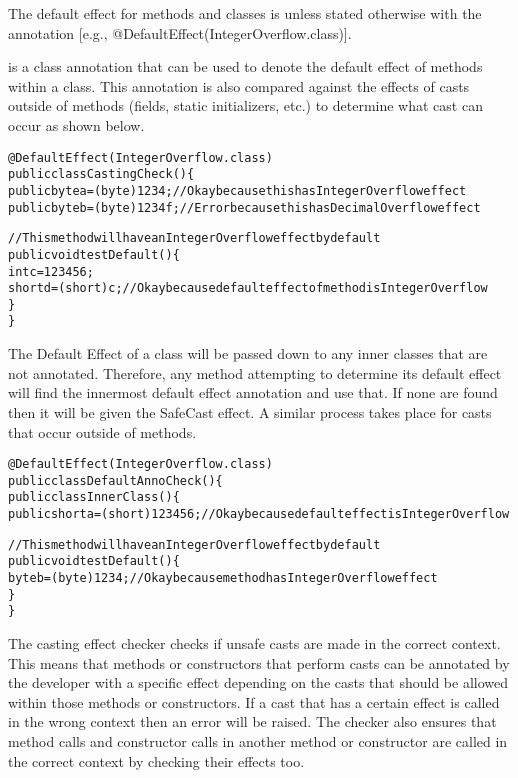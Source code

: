 The default effect for methods and classes is  unless stated otherwise with the  annotation [e.g., @DefaultEffect(IntegerOverflow.class)].

 is a class annotation that can be used to denote the default effect of methods within a class. This annotation is also compared against the effects of casts outside of methods (fields, static initializers, etc.) to determine what cast can occur as shown below.

\begin{alltt}
@DefaultEffect(IntegerOverflow.class)
public class CastingCheck() \{
    public byte a = (byte) 1234; //Okay because this has IntegerOverflow effect
    public byte b = (byte) 1234f; //Error because this has DecimalOverflow effect

    //This method will have an IntegerOverflow effect by default
    public void testDefault() \{
        int c = 123456;
        short d = (short) c; //Okay because default effect of method is IntegerOverflow
    \}
\}
\end{alltt}

The Default Effect of a class will be passed down to any inner classes that are not annotated. Therefore, any method attempting to determine its default effect will find the innermost default effect annotation and use that. If none are found then it will be given the SafeCast effect. A similar process takes place for casts that occur outside of methods.
\begin{alltt}
@DefaultEffect(IntegerOverflow.class)
public class DefaultAnnoCheck() \{
    public class InnerClass() \{
        public short a = (short) 123456; //Okay because default effect is IntegerOverflow

        //This method will have an IntegerOverflow effect by default
        public void testDefault() \{
            byte b = (byte) 1234; //Okay because method has IntegerOverflow effect
        \}
\}
\end{alltt}


The casting effect checker checks if unsafe casts are made in the correct context. This means that methods or constructors that perform casts can be annotated by the developer with a specific effect depending on the casts that should be allowed within those methods or constructors. If a cast that has a certain effect is called in the wrong context then an error will be raised. The checker also ensures that method calls and constructor calls in another method or constructor are called in the correct context by checking their effects too.

